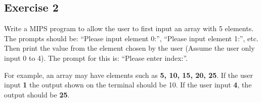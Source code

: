 \subsection{Exercise 2}
Write a MIPS program to allow the user to first input an array with 5
elements. The prompts should be: ``Please input element 0:'', ``Please input
element 1:'', etc. Then print the value from the element chosen by the user
(Assume the user only input 0 to 4). The prompt for this is: ``Please enter
index:''.

For example, an array may have elements such as \textbf{5, 10, 15, 20, 25}. If
the user input \textbf{1} the output shown on the terminal should be 10. If the user
input \textbf{4}, the output should be \textbf{25}.

